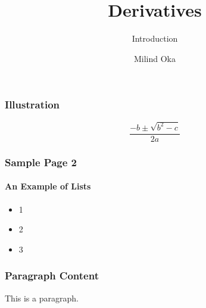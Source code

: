 \documentclass{beamer}
\title{Derivatives}
\subtitle{Introduction}
\author{Milind Oka}
\begin{document}
	\frame 
	{
		\titlepage
	}
	
	
	\frame 
	{
		\frametitle{Illustration}
		
		
		
		\[\frac{-b \pm \sqrt{b^2 - c}}{2a}\]
	}
	
	
	\frame
	{
		
		\frametitle{Sample Page 2}
		\framesubtitle{An Example of Lists}
		\begin{itemize}
			\item 1
			\item 2
			\item 3
		\end{itemize}
		
	}
	
	\begin{frame}
	    \frametitle{Paragraph Content}
	    This is a paragraph.
	 \end{frame}
	 
	 
\end{document}

